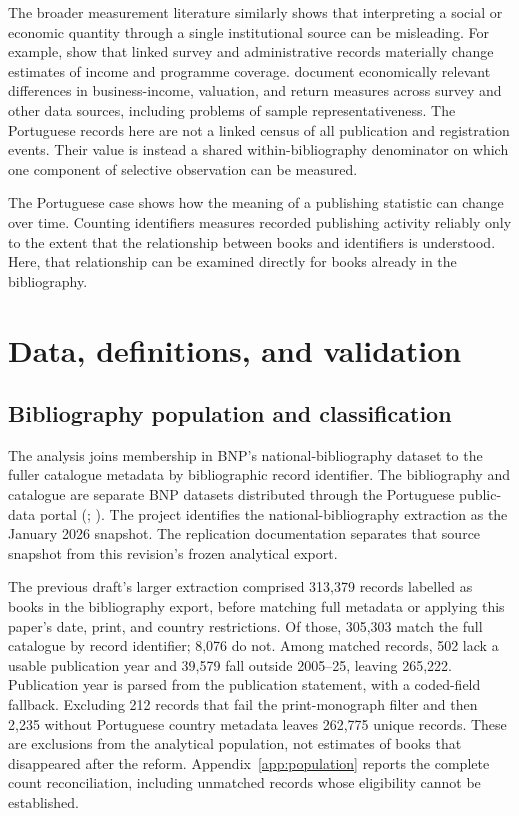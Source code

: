 \documentclass[11pt]{article}
\begin{document}
The broader measurement literature similarly shows that interpreting a social or economic quantity through a single institutional source can be misleading. For example, \citet{meyer2019} show that linked survey and administrative records materially change estimates of income and programme coverage. \citet{bhandari2020} document economically relevant differences in business-income, valuation, and return measures across survey and other data sources, including problems of sample representativeness. The Portuguese records here are not a linked census of all publication and registration events. Their value is instead a shared within-bibliography denominator on which one component of selective observation can be measured.

The Portuguese case shows how the meaning of a publishing statistic can change over time. Counting identifiers measures recorded publishing activity reliably only to the extent that the relationship between books and identifiers is understood. Here, that relationship can be examined directly for books already in the bibliography.

\section{Data, definitions, and validation}

\subsection{Bibliography population and classification}

The analysis joins membership in BNP's national-bibliography dataset to the fuller catalogue metadata by bibliographic record identifier. The bibliography and catalogue are separate BNP datasets distributed through the Portuguese public-data portal (\citealp{bnpdata}; \citealp{bnpcatalogue}). The project identifies the national-bibliography extraction as the January 2026 snapshot. The replication documentation separates that source snapshot from this revision's frozen analytical export.

The previous draft's larger extraction comprised 313,379 records labelled as books in the bibliography export, before matching full metadata or applying this paper's date, print, and country restrictions. Of those, 305,303 match the full catalogue by record identifier; 8,076 do not. Among matched records, 502 lack a usable publication year and 39,579 fall outside 2005--25, leaving 265,222. Publication year is parsed from the publication statement, with a coded-field fallback. Excluding 212 records that fail the print-monograph filter and then 2,235 without Portuguese country metadata leaves 262,775 unique records. These are exclusions from the analytical population, not estimates of books that disappeared after the reform. Appendix~\ref{app:population} reports the complete count reconciliation, including unmatched records whose eligibility cannot be established.
\end{document}
